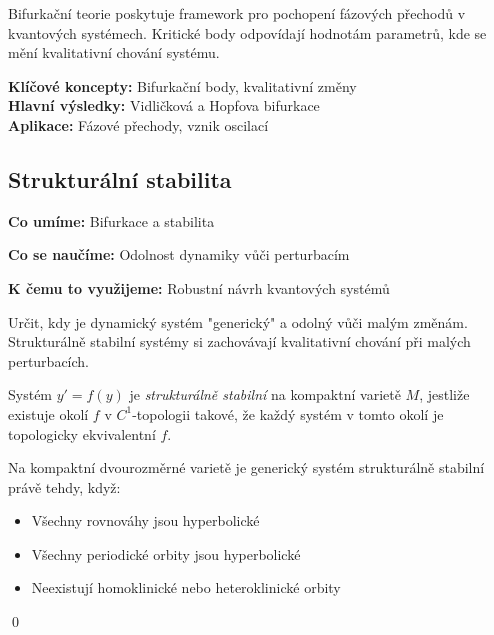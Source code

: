 \begin{keyinsight}
Bifurkační teorie poskytuje framework pro pochopení fázových přechodů v kvantových systémech. Kritické body odpovídají hodnotám parametrů, kde se mění kvalitativní chování systému.
\end{keyinsight}

\begin{summary}
\textbf{Klíčové koncepty:} Bifurkační body, kvalitativní změny \\
\textbf{Hlavní výsledky:} Vidličková a Hopfova bifurkace \\
\textbf{Aplikace:} Fázové přechody, vznik oscilací
\end{summary}

\spc

\subsection{Strukturální stabilita}

\begin{scaffold}
\item[] \textbf{Co umíme:} Bifurkace a stabilita
\item[] \textbf{Co se naučíme:} Odolnost dynamiky vůči perturbacím  
\item[] \textbf{K čemu to využijeme:} Robustní návrh kvantových systémů
\end{scaffold}

\begin{motivation}
Určit, kdy je dynamický systém "generický" a odolný vůči malým změnám. Strukturálně stabilní systémy si zachovávají kvalitativní chování při malých perturbacích.
\end{motivation}

\begin{definition}
Systém $y' = f(y)$ je \emph{strukturálně stabilní} na kompaktní varietě $M$, jestliže existuje okolí $f$ v $C^1$-topologii takové, že každý systém v tomto okolí je topologicky ekvivalentní $f$.
\end{definition}

\begin{theorem}
Na kompaktní dvourozměrné varietě je generický systém strukturálně stabilní právě tehdy, když:
\begin{itemize}
\item Všechny rovnováhy jsou hyperbolické
\item Všechny periodické orbity jsou hyperbolické  
\item Neexistují homoklinické nebo heteroklinické orbity
\end{itemize}
\qed
\end{theorem}

